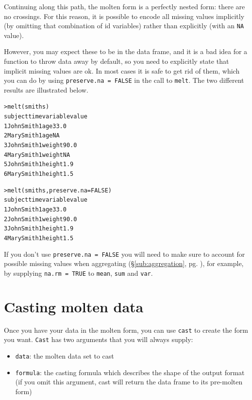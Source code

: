 \documentclass[oneside,letterpaper]{scrartcl}
\newcommand{\secref}[1]{\S \ref{#1}, pg. \pageref{#1}}
\begin{document}
Continuing along this path, the molten form is a perfectly nested form: there are no crossings.  For this reason, it is possible to encode all missing values implicitly (by omitting that combination of id variables) rather than explicitly (with an {\tt NA} value).

However, you may expect these to be in the data frame, and it is a bad idea for a function to throw data away by default, so you need to explicitly state that implicit missing values are ok.  In most cases it is safe to get rid of them, which you can do by using {\tt preserve.na = FALSE} in the call to {\tt melt}.  The two different results are illustrated below.

\begin{alltt}
> melt(smiths)
     subject time variable value
1 John Smith    1      age  33.0
2 Mary Smith    1      age    NA
3 John Smith    1   weight  90.0
4 Mary Smith    1   weight    NA
5 John Smith    1   height   1.9
6 Mary Smith    1   height   1.5

> melt(smiths, preserve.na = FALSE)
     subject time variable value
1 John Smith    1      age  33.0
2 John Smith    1   weight  90.0
3 John Smith    1   height   1.9
4 Mary Smith    1   height   1.5

\end{alltt}
 
If you don't use {\tt preserve.na = FALSE} you will need to make sure to account for possible missing values when aggregating (\secref{sub:aggregation}), for example, by supplying {\tt na.rm = TRUE} to {\tt mean}, {\tt sum} and {\tt var}.

\newpage
\section{Casting molten data}\label{sec:cast}

Once you have your data in the molten form, you can use {\tt cast} to create the form you want.  {\tt Cast} has two arguments that you will always supply:

\begin{itemize}
	\item {\tt data}: the molten data set to cast
	\item {\tt formula}: the casting formula which describes the shape of the output format (if you omit this argument, cast will return the data frame to its pre-molten form)
\end{itemize} 
\end{document}
